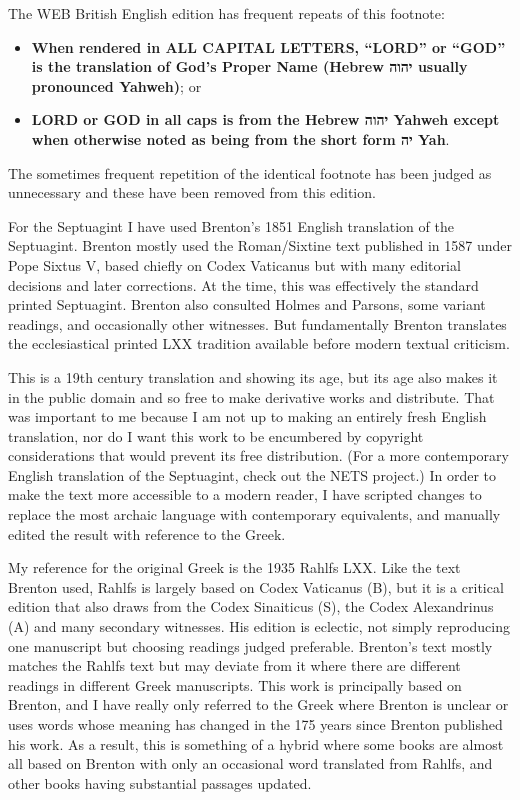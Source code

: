{{\ifbritish
The WEB British English edition has frequent repeats of this footnote:
\begin{itemize}
\item\textbf{\small When rendered in ALL CAPITAL LETTERS, “LORD” or “GOD” is the translation of God’s Proper Name (Hebrew \texthebrew{ יהוה} usually pronounced Yahweh)}; or
\item\textbf{\small LORD or GOD in all caps is from the Hebrew \texthebrew{ יהוה} Yahweh except when otherwise noted as being from the short form \texthebrew{ יה} Yah}.
\end{itemize}
The sometimes frequent repetition of the identical footnote has been judged as unnecessary and these have been removed from this edition.
\fi

For the Septuagint I have used Brenton's 1851 English translation of the Septuagint. Brenton mostly used the Roman/Sixtine text published in 1587 under Pope Sixtus V, based chiefly on Codex Vaticanus but with many editorial decisions and later corrections. At the time, this was effectively the standard printed Septuagint. Brenton also consulted Holmes and Parsons, some variant readings, and occasionally other witnesses. But fundamentally Brenton translates the ecclesiastical printed LXX tradition available before modern textual criticism. 

This is a 19th century translation and showing its age, but its age also makes it in the public domain and so free to make derivative works and distribute. That was important to me because I am not up to making an entirely fresh English translation, nor do I want this work to be encumbered by copyright considerations that would prevent its free distribution. (For a more contemporary English translation of the Septuagint, check out the NETS project.) In order to make the text more accessible to a modern reader, I have scripted changes to replace the most archaic language with contemporary equivalents, and manually edited the result with reference to the Greek.

My reference for the original Greek is the 1935 Rahlfs LXX. Like the text Brenton used, Rahlfs is largely based on Codex Vaticanus (B), but it is a critical edition that also draws from the Codex Sinaiticus (S), the Codex Alexandrinus (A) and many secondary witnesses. His edition is eclectic, not simply reproducing one manuscript but choosing readings judged preferable. Brenton's text mostly matches the Rahlfs text but may deviate from it where there are different readings in different Greek manuscripts. This work is principally based on Brenton, and I have really only referred to the Greek where Brenton is unclear or uses words whose meaning has changed in the 175 years since Brenton published his work. As a result, this is something of a hybrid where some books are almost all based on Brenton with only an occasional word translated from Rahlfs, and other books having substantial passages updated.

}}
